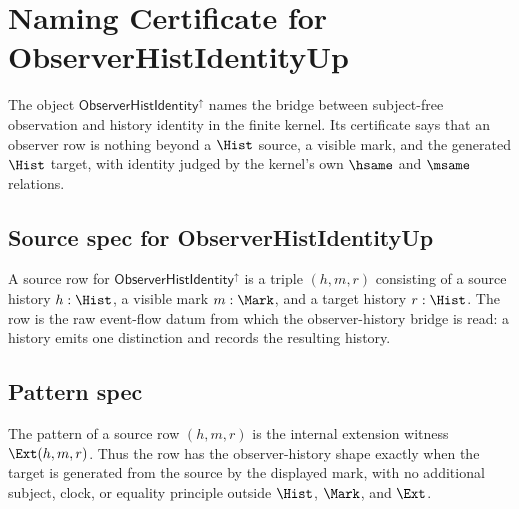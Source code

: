 \newcommand{\ObserverHistIdentityUp}{\mathsf{ObserverHistIdentity}^{\uparrow}}

\chapter{Naming Certificate for ObserverHistIdentityUp}
\label{ch:concrete-instances-observer-hist-identity}

The object $\ObserverHistIdentityUp$ names the bridge between subject-free observation and history identity in the finite kernel. Its certificate says that an observer row is nothing beyond a $\Hist$ source, a visible mark, and the generated $\Hist$ target, with identity judged by the kernel's own $\hsame$ and $\msame$ relations.

\section{Source spec for ObserverHistIdentityUp}
\label{sec:concrete-instances-observer-hist-identity-source-spec}

\begin{definition}
\label{def:concrete-instances-observer-hist-identity-source-rows}
A source row for $\ObserverHistIdentityUp$ is a triple $(h,m,r)$ consisting of a source history $h : \Hist$, a visible mark $m : \Mark$, and a target history $r : \Hist$. The row is the raw event-flow datum from which the observer-history bridge is read: a history emits one distinction and records the resulting history.
\end{definition}

\section{Pattern spec}
\label{sec:concrete-instances-observer-hist-identity-pattern}

\begin{definition}
\label{def:concrete-instances-observer-hist-identity-pattern}
The pattern of a source row $(h,m,r)$ is the internal extension witness $\Ext(h,m,r)$. Thus the row has the observer-history shape exactly when the target is generated from the source by the displayed mark, with no additional subject, clock, or equality principle outside $\Hist$, $\Mark$, and $\Ext$.
\end{definition}

